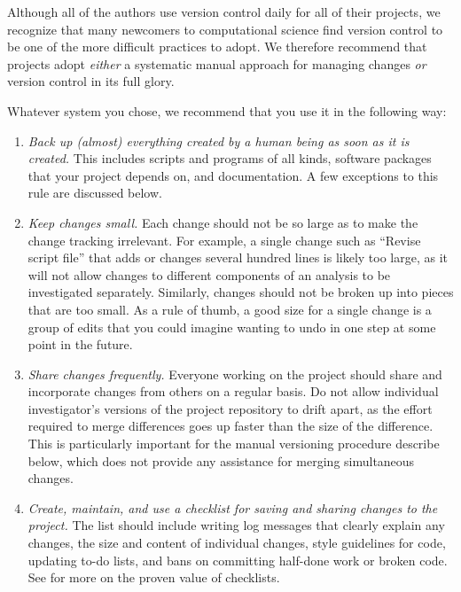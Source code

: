 \documentclass[10pt]{article}
\newcommand{\recommend}[1]{\textit{#1}}
\begin{document}
Although all of the authors use version control daily for all of their
projects, we recognize that many newcomers to computational science
find version control to be one of the more difficult practices to
adopt.  We therefore recommend that projects adopt \emph{either} a
systematic manual approach for managing changes \emph{or} version
control in its full glory.

Whatever system you chose, we recommend that you use it in the following way:

\begin{enumerate}

\item
  \recommend{Back up (almost) everything created by a human being as
    soon as it is created.} This includes scripts and programs of all
  kinds, software packages that your project depends on, and
  documentation. A few exceptions to this rule are discussed below.

\item
  \recommend{Keep changes small.}  Each change should not be so large
  as to make the change tracking irrelevant. For example, a single
  change such as ``Revise script file'' that adds or changes several
  hundred lines is likely too large, as it will not allow changes to
  different components of an analysis to be investigated
  separately. Similarly, changes should not be broken up into pieces
  that are too small. As a rule of thumb, a good size for a single change is
  a group of edits that you could imagine wanting to undo in one step
  at some point in the future.

\item
  \recommend{Share changes frequently.} Everyone working on the
  project should share and incorporate changes from others on a
  regular basis. Do not allow individual investigator's versions of
  the project repository to drift apart, as the effort required to
  merge differences goes up faster than the size of the
  difference. This is particularly important for the manual versioning
  procedure describe below, which does not provide any
  assistance for merging simultaneous changes.

\item
  \recommend{Create, maintain, and use a checklist for saving and
    sharing changes to the project.}  The list should include writing
  log messages that clearly explain any changes, the size and content
  of individual changes, style guidelines for code, updating to-do
  lists, and bans on committing half-done work or broken code.  See
  \cite{gawande2011} for more on the proven value of checklists.

\end{enumerate}
\end{document}
